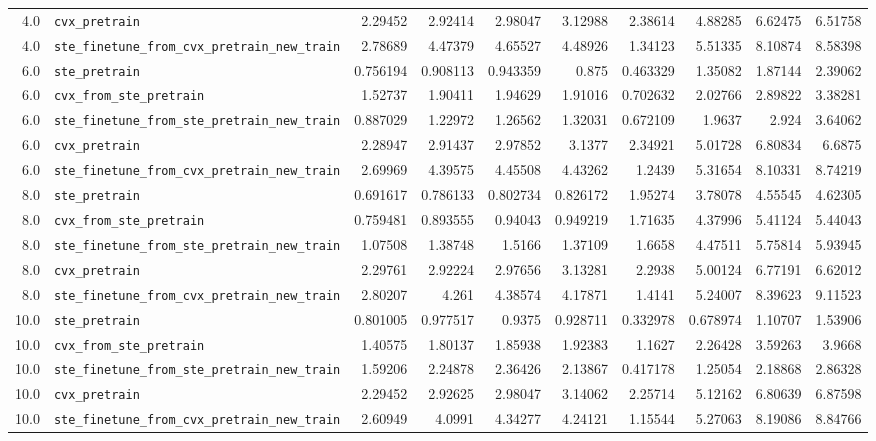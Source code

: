 \begin{longtable}{@{}r l *{8}{r}@{}}
4.0 & \texttt{cvx\_pretrain} & 2.29452 & 2.92414 & 2.98047 & 3.12988 & 2.38614 & 4.88285 & 6.62475 & 6.51758 \\
4.0 & \texttt{ste\_finetune\_from\_cvx\_pretrain\_new\_train} & 2.78689 & 4.47379 & 4.65527 & 4.48926 & 1.34123 & 5.51335 & 8.10874 & 8.58398 \\
6.0 & \texttt{ste\_pretrain} & 0.756194 & 0.908113 & 0.943359 & 0.875 & 0.463329 & 1.35082 & 1.87144 & 2.39062 \\
6.0 & \texttt{cvx\_from\_ste\_pretrain} & 1.52737 & 1.90411 & 1.94629 & 1.91016 & 0.702632 & 2.02766 & 2.89822 & 3.38281 \\
6.0 & \texttt{ste\_finetune\_from\_ste\_pretrain\_new\_train} & 0.887029 & 1.22972 & 1.26562 & 1.32031 & 0.672109 & 1.9637 & 2.924 & 3.64062 \\
6.0 & \texttt{cvx\_pretrain} & 2.28947 & 2.91437 & 2.97852 & 3.1377 & 2.34921 & 5.01728 & 6.80834 & 6.6875 \\
6.0 & \texttt{ste\_finetune\_from\_cvx\_pretrain\_new\_train} & 2.69969 & 4.39575 & 4.45508 & 4.43262 & 1.2439 & 5.31654 & 8.10331 & 8.74219 \\
8.0 & \texttt{ste\_pretrain} & 0.691617 & 0.786133 & 0.802734 & 0.826172 & 1.95274 & 3.78078 & 4.55545 & 4.62305 \\
8.0 & \texttt{cvx\_from\_ste\_pretrain} & 0.759481 & 0.893555 & 0.94043 & 0.949219 & 1.71635 & 4.37996 & 5.41124 & 5.44043 \\
8.0 & \texttt{ste\_finetune\_from\_ste\_pretrain\_new\_train} & 1.07508 & 1.38748 & 1.5166 & 1.37109 & 1.6658 & 4.47511 & 5.75814 & 5.93945 \\
8.0 & \texttt{cvx\_pretrain} & 2.29761 & 2.92224 & 2.97656 & 3.13281 & 2.2938 & 5.00124 & 6.77191 & 6.62012 \\
8.0 & \texttt{ste\_finetune\_from\_cvx\_pretrain\_new\_train} & 2.80207 & 4.261 & 4.38574 & 4.17871 & 1.4141 & 5.24007 & 8.39623 & 9.11523 \\
10.0 & \texttt{ste\_pretrain} & 0.801005 & 0.977517 & 0.9375 & 0.928711 & 0.332978 & 0.678974 & 1.10707 & 1.53906 \\
10.0 & \texttt{cvx\_from\_ste\_pretrain} & 1.40575 & 1.80137 & 1.85938 & 1.92383 & 1.1627 & 2.26428 & 3.59263 & 3.9668 \\
10.0 & \texttt{ste\_finetune\_from\_ste\_pretrain\_new\_train} & 1.59206 & 2.24878 & 2.36426 & 2.13867 & 0.417178 & 1.25054 & 2.18868 & 2.86328 \\
10.0 & \texttt{cvx\_pretrain} & 2.29452 & 2.92625 & 2.98047 & 3.14062 & 2.25714 & 5.12162 & 6.80639 & 6.87598 \\
10.0 & \texttt{ste\_finetune\_from\_cvx\_pretrain\_new\_train} & 2.60949 & 4.0991 & 4.34277 & 4.24121 & 1.15544 & 5.27063 & 8.19086 & 8.84766 \\
\end{longtable}

